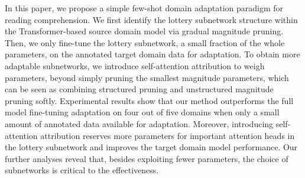 In this paper, we propose a simple few-shot domain adaptation paradigm for reading comprehension. We first identify the lottery subnetwork structure within the Transformer-based source domain model via gradual magnitude pruning. Then, we only fine-tune the lottery subnetwork, a small fraction of the whole parameters, on the annotated target domain data for adaptation. To obtain more adaptable subnetworks, we introduce self-attention attribution to weigh parameters,  beyond simply pruning the smallest magnitude parameters, which can be seen as combining structured pruning and unstructured magnitude pruning softly. Experimental results show that our method outperforms the full model fine-tuning adaptation on four out of five domains when only a small amount of annotated data available for adaptation. Moreover, introducing self-attention attribution reserves more parameters for important attention heads in the lottery subnetwork and improves the target domain model performance. Our further analyses reveal that, besides exploiting fewer parameters, the choice of subnetworks is critical to the effectiveness.
